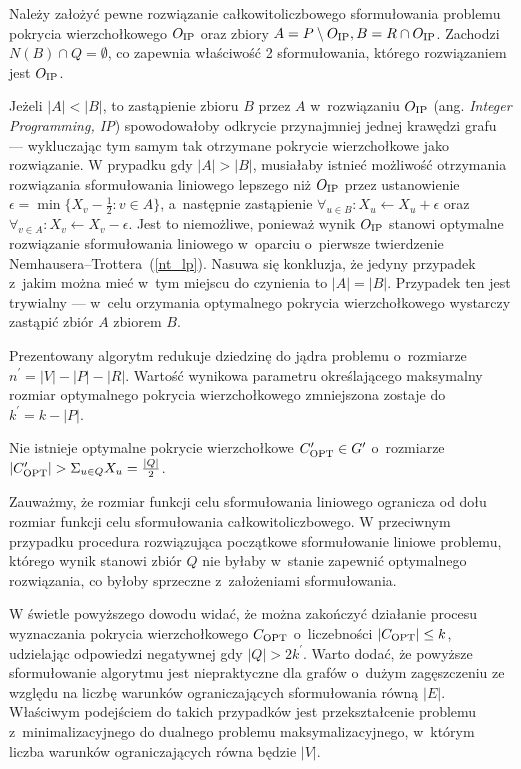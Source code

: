 \begin{bproof}
  Należy założyć pewne rozwiązanie całkowitoliczbowego sformułowania problemu 
  pokrycia wierzchołkowego $O_{\textnormal{IP}}$ oraz zbiory 
  ${A = P \setminus O_{\textnormal{IP}}, B = R \cap O_{\textnormal{IP}}}$.
  Zachodzi $N(B) \cap Q = \emptyset$, co zapewnia właściwość 2 sformułowania, którego rozwiązaniem jest $O_{\textnormal{IP}}$.

  Jeżeli $|A|<|B|$, to zastąpienie zbioru $B$ przez $A$ w~rozwiązaniu $O_{\textnormal{IP}}$ (ang. \emph{Integer Programming, IP}) spowodowałoby odkrycie przynajmniej jednej krawędzi grafu --- wykluczając tym samym tak otrzymane pokrycie wierzchołkowe jako rozwiązanie.
  W prypadku gdy $|A|>|B|$, musiałaby istnieć możliwość otrzymania rozwiązania sformułowania liniowego lepszego niż $O_{\textnormal{IP}}$ przez ustanowienie $\epsilon = \min\{X_v-\frac{1}{2}: v \in A\}$, a~następnie
  zastąpienie $\forall_{u \in B}:X_u \leftarrow X_u + \epsilon$ oraz $\forall_{v \in A}: X_v \leftarrow X_v -\epsilon$.
  Jest to niemożliwe, ponieważ wynik $O_{\textnormal{IP}}$ stanowi optymalne rozwiązanie sformułowania liniowego w~oparciu o~pierwsze twierdzenie Nemhausera--Trottera~(\ref{nt_lp}).
  Nasuwa się konkluzja, że jedyny przypadek z~jakim można mieć w~tym miejscu do czynienia to $|A|=|B|$.
  Przypadek ten jest trywialny --- w~celu orzymania optymalnego pokrycia wierzchołkowego wystarczy zastąpić zbiór $A$ zbiorem $B$.
\end{bproof}
Prezentowany algorytm redukuje dziedzinę do jądra problemu o~rozmiarze $n^\prime=|V|-|P|-|R|$.
Wartość wynikowa parametru określającego maksymalny rozmiar optymalnego pokrycia wierzchołkowego zmniejszona zostaje do $k^\prime=k-|P|$.
\begin{theorem}
  Nie istnieje optymalne pokrycie wierzchołkowe $C^\prime_{\textnormal{OPT}}\in G^\prime$ o~rozmiarze $|C^\prime_{\textnormal{OPT}}|>\Sigma_{u\in Q}X_u=\frac{|Q|}{2}$.
\end{theorem}
\begin{bproof}
  Zauważmy, że rozmiar funkcji celu sformułowania liniowego ogranicza od dołu rozmiar funkcji celu sformułowania całkowitoliczbowego.
  W przeciwnym przypadku procedura rozwiązująca początkowe sformułowanie liniowe problemu, którego wynik stanowi zbiór $Q$ nie byłaby w~stanie zapewnić optymalnego rozwiązania, co byłoby sprzeczne z~założeniami sformułowania.
\end{bproof}
\par{
  W świetle powyższego dowodu widać, że można zakończyć działanie procesu wyznaczania pokrycia wierzchołkowego $C_{\textnormal{OPT}}$ o~liczebności $|C_{\textnormal{OPT}}|\leq k$, udzielając odpowiedzi negatywnej gdy $|Q|>2k^\prime$.
  Warto dodać, że powyższe sformułowanie algorytmu jest niepraktyczne dla grafów o~dużym zagęszczeniu ze względu na liczbę warunków ograniczających sformułowania równą $|E|$.
  Właściwym podejściem do takich przypadków jest przekształcenie problemu z~minimalizacyjnego do dualnego problemu maksymalizacyjnego, w~którym liczba warunków ograniczających równa będzie $|V|$.
}
